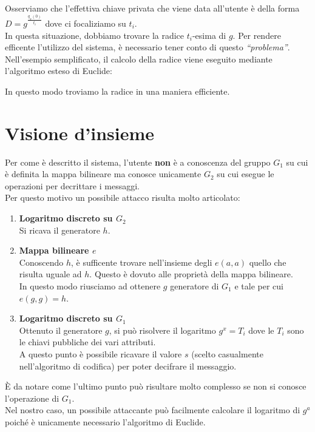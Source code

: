 Osserviamo che l'effettiva chiave privata che viene data all'utente è della forma $D = g^{\frac{q_x(0)}{t_i}}$ dove ci focaliziamo su $t_i$.\\
In questa situazione, dobbiamo trovare la radice $t_i$-esima di $g$. Per rendere efficente l'utilizzo del sistema, è necessario tener conto di questo \emph{``problema''}.\\
Nell'esempio semplificato, il calcolo della radice viene eseguito mediante l'algoritmo esteso di Euclide:

\begin{center}
\end{center}

In questo modo troviamo la radice in una maniera efficiente.



\section{Visione d'insieme}


Per come è descritto il sistema, l'utente \textbf{non} è a conoscenza del gruppo $G_1$ su cui è definita la mappa bilineare ma conosce unicamente $G_2$ su cui esegue le operazioni per decrittare i messaggi.\\
Per questo motivo un possibile attacco risulta molto articolato:
\begin{enumerate}
   \item\textbf{ Logaritmo discreto su $G_2$}\\
   Si ricava il generatore $h$.
   \item \textbf{Mappa bilineare $e$}\\
   Conoscendo $h$, è sufficente trovare nell'insieme degli $e(a,a)$ quello che risulta uguale ad $h$. Questo è dovuto alle proprietà della mappa bilineare.\\
   In questo modo riusciamo ad ottenere $g$ generatore di $G_1$ e tale per cui $e(g,g) = h$.
   \item\textbf{ Logaritmo discreto su $G_1$}\\
   Ottenuto il generatore $g$, si può risolvere il logaritmo $g^x = T_i$ dove le $T_i$ sono le chiavi pubbliche dei vari attributi.\\
   A questo punto è possibile ricavare il valore $s$ (scelto casualmente nell'algoritmo di codifica) per poter decifrare il messaggio.
\end{enumerate}

È da notare come l'ultimo punto può risultare molto complesso se non si conosce l'operazione di $G_1$.\\
Nel nostro caso, un possibile attaccante può facilmente calcolare il logaritmo di $g^a$ poiché è unicamente necessario l'algoritmo di Euclide.\\[0.5cm]
